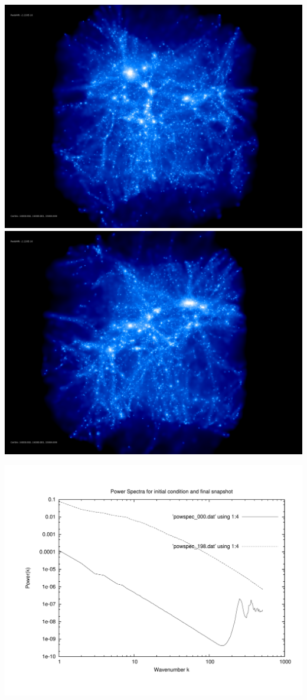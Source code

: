 \includegraphics[scale=0.1]{stages_18/rotate_00074.jpg} 
\includegraphics[scale=0.1]{stages_18/rotate_00131.jpg}

\includegraphics[scale=0.5]{stages_18/plot_powspec_stages_18}

